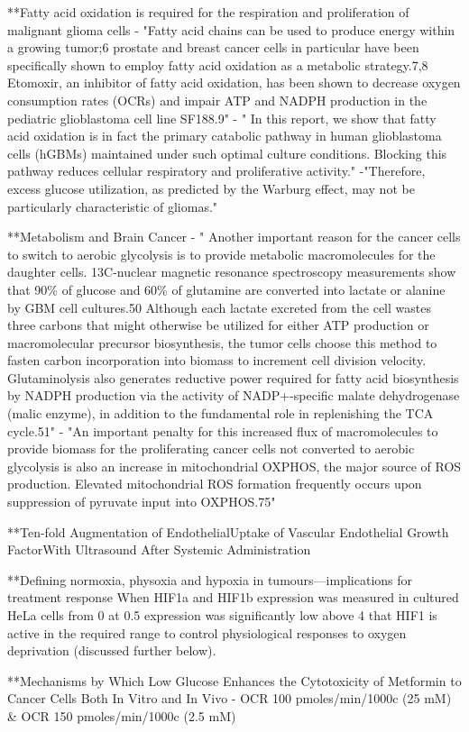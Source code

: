 \documentclass[11pt,a4paper]{article}
\begin{document}
**Fatty acid oxidation is required for the respiration and proliferation of malignant glioma cells
- "Fatty acid chains can be used to produce energy within a growing tumor;6 prostate and breast cancer cells in particular have been specifically shown to employ fatty acid oxidation as a metabolic strategy.7,8 Etomoxir, an inhibitor of fatty acid oxidation, has been shown to decrease oxygen consumption rates (OCRs) and impair ATP and NADPH production in the pediatric glioblastoma cell line SF188.9"
- "  In this report, we show that fatty acid oxidation is in fact the primary catabolic pathway in human glioblastoma cells (hGBMs) maintained under such optimal culture conditions. Blocking this pathway reduces cellular respiratory and proliferative activity."
-"Therefore, excess glucose utilization, as predicted by the Warburg effect, may not be particularly characteristic of gliomas."

**Metabolism and Brain Cancer
- " Another important reason for the cancer cells to switch to aerobic glycolysis is to provide metabolic macromolecules for the daughter cells. 13C-nuclear magnetic resonance spectroscopy measurements show that 90\% of glucose and 60\% of glutamine are converted into lactate or alanine by GBM cell cultures.50 Although each lactate excreted from the cell wastes three carbons that might otherwise be utilized for either ATP production or macromolecular precursor biosynthesis, the tumor cells choose this method to fasten carbon incorporation into biomass to increment cell division velocity. Glutaminolysis also generates reductive power required for fatty acid biosynthesis by NADPH production via the activity of NADP+-specific malate dehydrogenase (malic enzyme), in addition to the fundamental role in replenishing the TCA cycle.51"
- "An important penalty for this increased flux of macromolecules to provide biomass for the proliferating cancer cells not converted to aerobic glycolysis is also an increase in mitochondrial OXPHOS, the major source of ROS production. Elevated mitochondrial ROS formation frequently occurs upon suppression of pyruvate input into OXPHOS.75"

**Ten-fold Augmentation of EndothelialUptake of Vascular Endothelial Growth FactorWith Ultrasound After Systemic Administration

**Defining normoxia, physoxia and hypoxia in
tumours—implications for treatment response
When HIF1a and HIF1b expression was measured in cultured
HeLa cells from 0%
at 0.5%
expression was significantly low above 4%
that HIF1 is active in the required range to control physiological
responses to oxygen deprivation (discussed further below).

**Mechanisms by Which Low Glucose Enhances the Cytotoxicity of Metformin to Cancer Cells Both In Vitro and In Vivo
- OCR 100 pmoles/min/1000c (25 mM) \&  OCR 150 pmoles/min/1000c (2.5 mM)
\end{document}
